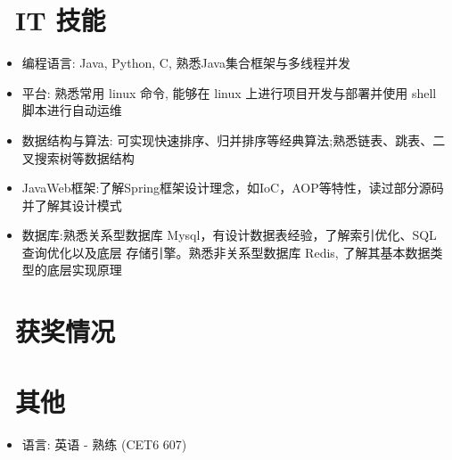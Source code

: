 \documentclass{resume}
\begin{document}

\section{\faCogs\ IT 技能}
\begin{itemize}[parsep=0.5ex]
  \item 编程语言: Java, Python, C, 熟悉Java集合框架与多线程并发
  \item 平台: 熟悉常用 linux 命令, 能够在 linux 上进行项目开发与部署并使用 shell 脚本进行自动运维
  \item 数据结构与算法: 可实现快速排序、归并排序等经典算法;熟悉链表、跳表、二叉搜索树等数据结构
  \item JavaWeb框架:了解Spring框架设计理念，如IoC，AOP等特性，读过部分源码并了解其设计模式
  \item 数据库:熟悉关系型数据库 Mysql，有设计数据表经验，了解索引优化、SQL 查询优化以及底层
 存储引擎。熟悉非关系型数据库 Redis, 了解其基本数据类型的底层实现原理
\end{itemize}

\section{\faHeartO\ 获奖情况}

\section{\faInfo\ 其他}
\begin{itemize}[parsep=0.5ex]
  \item 语言: 英语 - 熟练 (CET6 607)
\end{itemize}

%
%
\end{document}
